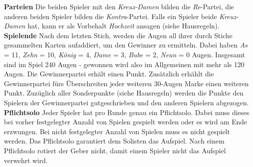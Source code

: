\documentclass[11pt,a4paper,landscape]{article}
\begin{document}
\begin{multicols}{3}
\textbf{Parteien} Die beiden Spieler mit den \textit{Kreuz-Damen} bilden die \textit{Re}-Partei, die anderen beiden Spieler bilden die \textit{Kontra}-Partei. Falls ein Spieler beide \textit{Kreuz-Damen} hat, kann er als Vorbehalt \textit{Hochzeit} ansagen (siehe Hausregeln). \\

\textbf{Spielende} Nach dem letzten Stich, werden die Augen all ihrer durch Stiche gesammelten Karten aufaddiert, um den Gewinner zu ermitteln. Dabei haben \textit{As} = 11, \textit{Zehn} = 10, \textit{König} = 4, \textit{Dame} = 3, \textit{Bube} = 2, \textit{Neun} = 0 Augen. Insgesamt sind im Spiel 240 Augen - gewonnen wird also im Allgemeinen mit mehr als 120 Augen. Die Gewinnerpartei erhält einen Punkt. Zusätzlich erhählt die Gewinnerpartei fürs Überschreiten jeder weiteren 30-Augen Marke einen weiteren Punkt. Zuzüglich aller Sonderpunkte (siehe Hausregeln) werden die Punkte den Spielern der Gewinnerpartei gutgeschrieben und den anderen Spielern abgezogen. \\

\textbf{Pflichtsolo} Jeder Spieler hat pro Runde genau ein Pflichtsolo. Dabei muss dieses bei vorher festgelegter Anzahl von Spielen gespielt werden oder es wird am Ende erzwungen. Bei nicht festgelegter Anzahl von Spielen muss es nicht gespielt werden. Das Pflichtsolo garantiert dem Solisten das Aufspiel. Nach einem Pflichtsolo rotiert der Geber nicht, damit einem Spieler nicht das Aufspiel verwehrt wird. 

\end{multicols}
\end{document}
